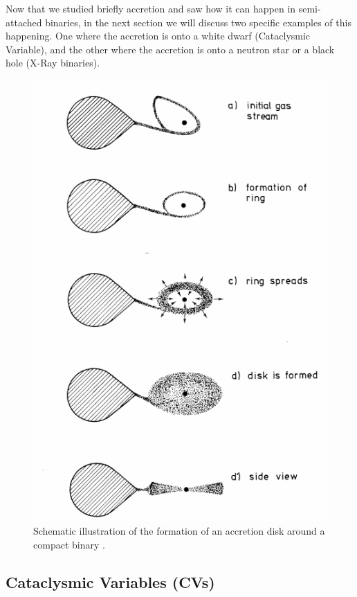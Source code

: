 Now that we studied briefly accretion and saw how it can happen in semi-attached binaries, in the next section we will discuss two specific examples of this happening. One where the accretion is onto a white dwarf (Cataclysmic Variable), and the other where the accretion is onto a neutron star or a black hole (X-Ray binaries). 


\begin{figure}[]
        \centering
\includegraphics[scale=.3]{assets/images/accretiondisk.png}
\caption{Schematic illustration of the formation of an accretion disk around a compact binary \citep{verbunt_accretion_1982}.}
\label{fig:roche}
\end{figure}


\subsection{Cataclysmic Variables (CVs)}

